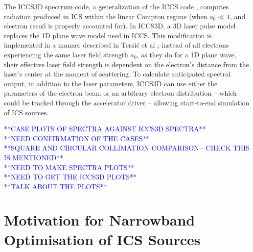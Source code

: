 \documentclass[../main.tex]{subfiles}
\begin{document}
The \textsc{ICCS3D} spectrum code, a generalization of the \textsc{ICCS} code \cite{krafft2016laser,ranjan2018simulation}, computes radiation produced in ICS within the linear Compton regime (when $a_{0}\ll 1$, and electron recoil is properly accounted for). In \textsc{ICCS3D}, a 3D laser pulse model replaces the 1D plane wave model used in \textsc{ICCS}. This modification is implemented in a manner described in Terzi\'c et al \cite{terzic2019improving}; instead of all electrons experiencing the same laser field strength $a_{0}$, as they do for a 1D plane wave, their effective laser field strength is dependent on the electron's distance from the laser's center at the moment of scattering. To calculate anticipated spectral output, in addition to the laser parameters, \textsc{ICCS3D} can use either the parameters of the electron beam or an arbitrary electron distribution -- which could be tracked through the accelerator driver -- allowing start-to-end simulation of ICS sources. 

\textcolor{blue}{**CASE PLOTS OF SPECTRA AGAINST ICCS3D SPECTRA** \\ **NEED CONFIRMATION OF THE CASES** \\ **SQUARE AND CIRCULAR COLLIMATION COMPARISON - CHECK THIS IS MENTIONED** \\ **NEED TO MAKE SPECTRA PLOTS** \\ **NEED TO GET THE ICCS3D PLOTS** \\ **TALK ABOUT THE PLOTS**}

\section{Motivation for Narrowband Optimisation of ICS Sources}
\label{sec:motivation_optimisation}
\end{document}
